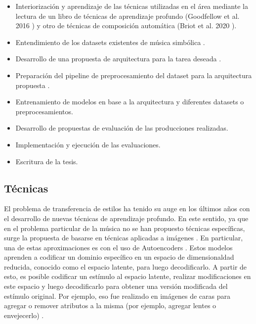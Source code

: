\documentclass[10pt]{article}
\begin{document}
\begin{itemize}
\item Interiorización y aprendizaje de las técnicas utilizadas en el área
  mediante la lectura de un libro de técnicas de aprendizaje profundo
  (Goodfellow et al. 2016 \cite{goodfellow2016deep}) y otro de técnicas de
  composición automática (Briot et al. 2020 \cite{briot2020deep}).
\item Entendimiento de los datasets existentes de música simbólica  \cite{Cuthbert2010Music21AT}.
\item Desarrollo de una propuesta de arquitectura para la tarea deseada \cite{guo2020variational, roberts2019musicvae}.
\item Preparación del pipeline de preprocesamiento del dataset para la arquitectura propuesta \cite{Cuthbert2010Music21AT}.
\item Entrenamiento de modelos en base a la arquitectura y diferentes datasets o preprocesamientos.
\item Desarrollo de propuestas de evaluación de las producciones realizadas.
\item Implementación y ejecución de las evaluaciones.
\item Escritura de la tesis.
\end{itemize}

\subsection*{Técnicas}
El problema de transferencia de estilos ha tenido su auge en los últimos años
con el desarrollo de nuevas técnicas de aprendizaje profundo. En este
sentido, ya que en el problema particular de la música no se han propuesto
técnicas específicas, surge la propuesta de basarse en técnicas aplicadas a
imágenes \cite{briot2020deep}. En particular, una de estas aproximaciones es
con el uso de Autoencoders \cite{goodfellow2016deep}. Estos modelos aprenden a
codificar un dominio específico en un espacio de dimensionaldad reducida,
conocido como el espacio latente, para luego decodificarlo. A partir de esto,
es posible codificar un estímulo al espacio latente, realizar modificaciones
en este espacio y luego decodificarlo para obtener una versión modificada del
estímulo original. Por ejemplo, eso fue realizado en imágenes de caras para
agregar o remover atributos a la misma (por ejemplo, agregar lentes o
envejecerlo) \cite{upchurch2016feature}.
\end{document}

